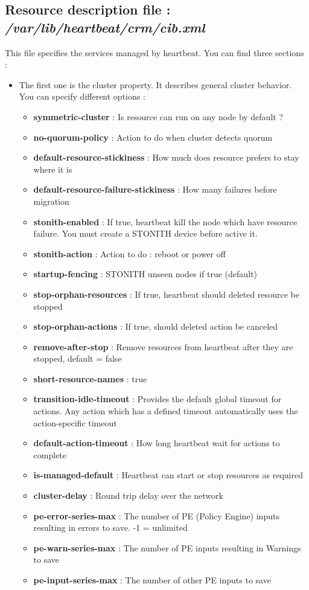 \documentclass[a4paper,10pt]{report}
\begin{document}
\subsection{Resource description file : \textit{/var/lib/heartbeat/crm/cib.xml}}
This file specifies the services managed by heartbeat. You can find three sections :
\begin{itemize}
\item The first one is the cluster property. It describes general cluster behavior. You can specify different options :

\begin{itemize}
\item \textbf{symmetric-cluster} : Is resource can run on any node by default ?
\item \textbf{no-quorum-policy} : Action to do when cluster detects quorum
\item \textbf{default-resource-stickiness} : How much does resource prefers to stay where it is
\item \textbf{default-resource-failure-stickiness} : How many failures before migration
\item \textbf{stonith-enabled} : If true, heartbeat kill the node which have resource failure. You must create a STONITH device before active it.
\item \textbf{stonith-action} : Action to do : reboot or power off
\item \textbf{startup-fencing} : STONITH unseen nodes if true (default)
\item \textbf{stop-orphan-resources} : If true, heartbeat should deleted resource be stopped
\item \textbf{stop-orphan-actions} : If true, should deleted action be canceled
\item \textbf{remove-after-stop} : Remove resources from heartbeat after they are stopped, default = false
\item \textbf{short-resource-names} : true
\item \textbf{transition-idle-timeout} : Provides the default global timeout for actions. Any action which has a defined timeout automatically
uses the action-specific timeout
\item \textbf{default-action-timeout} : How long heartbeat wait for actions to complete
\item \textbf{is-managed-default} : Heartbeat can start or stop resources as required
\item \textbf{cluster-delay} : Round trip delay over the network
\item \textbf{pe-error-series-max} : The number of PE (Policy Engine) inputs resulting in errors to save. -1 = unlimited
\item \textbf{pe-warn-series-max} : The number of PE inputs resulting in Warnings to save
\item \textbf{pe-input-series-max} : The number of other PE inputs to save
\end{itemize}


\end{itemize}
\end{document}

